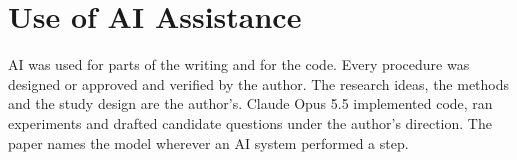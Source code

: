 \section*{Use of AI Assistance}
\label{sec:ai}

AI was used for parts of the writing and for the code. Every procedure was designed or approved and verified by the author. The research ideas, the methods and the study design are the author's. Claude Opus 5.5 implemented code, ran experiments and drafted candidate questions under the author's direction. The paper names the model wherever an AI system performed a step.
